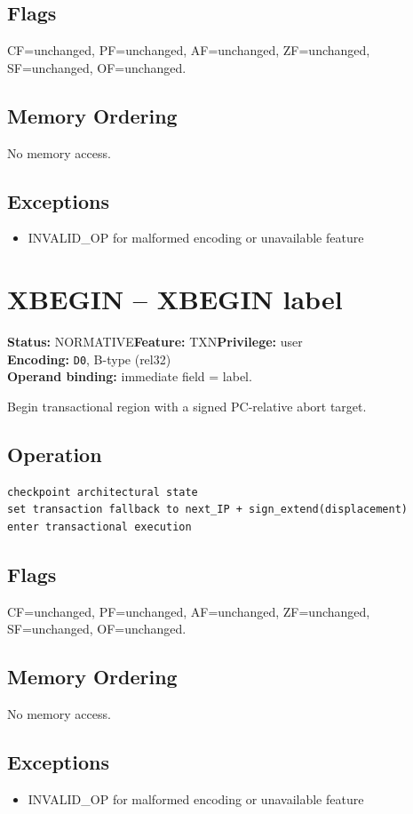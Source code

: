 \documentclass[10pt]{article}
\begin{document}
\subsection*{Flags}
CF=unchanged, PF=unchanged, AF=unchanged, ZF=unchanged, SF=unchanged, OF=unchanged.
\subsection*{Memory Ordering}
No memory access.
\subsection*{Exceptions}
\begin{itemize}
\item INVALID\_OP for malformed encoding or unavailable feature
\end{itemize}
\clearpage

\section{XBEGIN -- XBEGIN label}
\textbf{Status:} NORMATIVE\quad \textbf{Feature:} TXN\quad \textbf{Privilege:} user\\
\textbf{Encoding:} \texttt{D0}, B-type (rel32)\\
\textbf{Operand binding:} immediate field = label.

Begin transactional region with a signed PC-relative abort target.

\subsection*{Operation}
\begin{lstlisting}
checkpoint architectural state
set transaction fallback to next_IP + sign_extend(displacement)
enter transactional execution
\end{lstlisting}
\subsection*{Flags}
CF=unchanged, PF=unchanged, AF=unchanged, ZF=unchanged, SF=unchanged, OF=unchanged.
\subsection*{Memory Ordering}
No memory access.
\subsection*{Exceptions}
\begin{itemize}
\item INVALID\_OP for malformed encoding or unavailable feature
\end{itemize}
\clearpage
\end{document}
